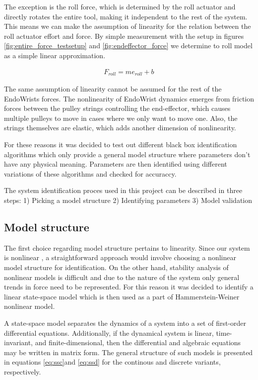 The exception is the roll force, which is determined by the roll actuator and directly rotates the entire tool, making it independent to the rest of the system.
This means we can make the assumption of linearity for the relation between the roll actuator effort and force.  
By simple measurement with the setup in figures \ref{fig:entire_force_testsetup} and \ref{fig:endeffector_force} we determine to roll model as a simple
linear approximation.

\begin{align}
F_{roll} = m e_{roll} + b
\end{align}

The same assumption of linearity cannot be assumed for the rest of the EndoWrists forces.
The nonlinearity of EndoWrist dynamics emerges from friction forces between the pulley strings controlling the end-effector, which causes multiple pulleys to move in cases where we only want to move one. 
Also, the strings themselves are elastic, which adds another dimension of nonlinearity.

For these reasons it was decided to test out different black box identification algorithms which only provide a general model structure where parameters don't have any physical meaning. Parameters are then identified using different variations of these algorithms and checked for accuraccy.

The system identification proces used in this project can be described in three steps:
1) Picking a model structure
2) Identifying parameters
3) Model validation

\subsection{Model structure}
The first choice regarding model structure pertains to linearity.
Since our system is nonlinear , a straightforward approach would involve choosing a nonlinear model structure for identification.
On the other hand, stability analysis of nonlinear models is difficult and due to the nature of the system only general trends in force need to be represented.
For this reason it was decided to identify a linear state-space model which is then used as a part of Hammerstein-Weiner nonlinear model.

A state-space model separates the dynamics of a system into a set of first-order differential equations.
Additionally, if the dynamical system is linear, time-invariant, and finite-dimensional, then the differential and algebraic equations may be written in matrix form. The general structure of such models is presented in equations \ref{eq:ssc}and \ref{eq:ssd} for the continous and discrete variants, respectively.

